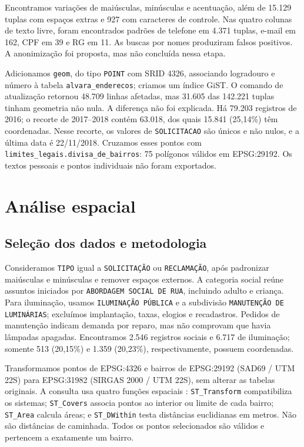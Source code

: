 \documentclass[12pt]{article}
\begin{document}
Encontramos variações de maiúsculas, minúsculas e acentuação, além de 15.129
tuplas com espaços extras e 927 com caracteres de controle. Nas quatro colunas de texto
livre, foram encontrados padrões de telefone em 4.371 tuplas, e-mail em 162,
CPF em 39 e RG em 11. As buscas por nomes produziram falsos positivos. A
anonimização foi proposta, mas não concluída nessa etapa.

Adicionamos \texttt{geom}, do tipo \texttt{POINT} com SRID 4326, associando
logradouro e número à tabela \texttt{alvara\_enderecos}; criamos um índice
GiST. O comando de atualização retornou 48.709 linhas afetadas, mas 31.605 das 142.221
tuplas tinham geometria não nula. A diferença não foi explicada. Há 79.203
registros de 2016; o recorte de 2017--2018 contém 63.018, dos quais 15.841
(25,14\%) têm coordenadas. Nesse recorte, os valores de \texttt{SOLICITACAO}
são únicos e não nulos, e a última data é 22/11/2018. Cruzamos esses pontos com
\texttt{limites\_legais.divisa\_de\_bairros}: 75 polígonos válidos em EPSG:29192.
Os textos pessoais e pontos individuais não foram exportados.

\section{Análise espacial}
\subsection{Seleção dos dados e metodologia}
Consideramos \texttt{TIPO} igual a \texttt{SOLICITAÇÃO} ou \texttt{RECLAMAÇÃO},
após padronizar maiúsculas e minúsculas e remover espaços externos. A categoria social reúne assuntos
iniciados por \texttt{ABORDAGEM SOCIAL DE RUA}, incluindo adulto e criança.
Para iluminação, usamos \texttt{ILUMINAÇÃO PÚBLICA} e a subdivisão
\texttt{MANUTENÇÃO DE LUMINÁRIAS}; excluímos implantação, taxas, elogios e
recadastros. Pedidos de manutenção indicam demanda por reparo, mas não comprovam
que havia lâmpadas apagadas. Encontramos 2.546 registros sociais e 6.717 de iluminação;
somente 513 (20,15\%) e 1.359 (20,23\%), respectivamente, possuem coordenadas.

Transformamos pontos de EPSG:4326 e bairros de EPSG:29192 (SAD69 / UTM 22S)
para EPSG:31982 (SIRGAS 2000 / UTM 22S), sem alterar as tabelas originais.
A consulta usa quatro funções espaciais \cite{postgis}: \texttt{ST\_Transform}
compatibiliza os sistemas; \texttt{ST\_Covers} associa pontos ao interior ou
limite de cada bairro; \texttt{ST\_Area} calcula áreas; e \texttt{ST\_DWithin}
testa distâncias euclidianas em metros. Não são distâncias de caminhada.
Todos os pontos selecionados são válidos e pertencem a exatamente um bairro.
\end{document}
